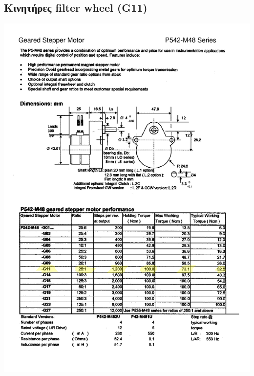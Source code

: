 \documentclass[
  a4paper,
  twoside,
  titlepage,
  12pt]{article}
\numberwithin{equation}{section}
\numberwithin{figure}{section}
\numberwithin{table}{section}
\begin{document}
\hypertarget{ux3baux3b9ux3bdux3b7ux3c4ux3aeux3c1ux3b5ux3c2-filter-wheel-g11}{%
\subsection{Κινητήρες filter wheel (G11)}\label{ux3baux3b9ux3bdux3b7ux3c4ux3aeux3c1ux3b5ux3c2-filter-wheel-g11}}

\begin{center}\includegraphics[width=1\linewidth]{./files/FWmotor} \end{center}
\end{document}
